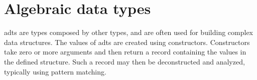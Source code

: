 \section{Algebraic data types}

\Glspl{adt} are types composed by other types, and are often used for building complex data structures. The values of \glspl{adt} are created using constructors. Constructors take zero or more arguments and then return a record containing the values in the defined structure. Such a record may then be deconstructed and analyzed, typically using pattern matching.